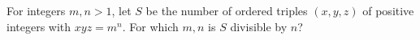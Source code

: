 For integers $m,n>1$, let $S$ be the number of ordered triples $(x,y,z)$ of positive integers with $xyz=m^n$. For which $m,n$ is $S$ divisible by $n$?
